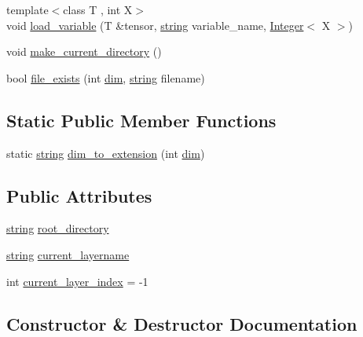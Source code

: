 \begin{DoxyCompactItemize}
\item 
{\footnotesize template$<$class T , int X$>$ }\\void \hyperlink{structbc_1_1nn_1_1Layer__Loader_a1f23f8e38f957267f2169281e79b4103}{load\+\_\+variable} (T \&tensor, \hyperlink{structbc_1_1string}{string} variable\+\_\+name, \hyperlink{structbc_1_1traits_1_1Integer}{Integer}$<$ X $>$)
\item 
void \hyperlink{structbc_1_1nn_1_1Layer__Loader_accce0f02309037abf68531b2b9f2c13d}{make\+\_\+current\+\_\+directory} ()
\item 
bool \hyperlink{structbc_1_1nn_1_1Layer__Loader_aa92b4f66ab53cad2bbb3def3303b6d30}{file\+\_\+exists} (int \hyperlink{namespacebc_a28c12b5b6f9955c77a8c4b0cf047cfb6}{dim}, \hyperlink{structbc_1_1string}{string} filename)
\end{DoxyCompactItemize}
\subsection*{Static Public Member Functions}
\begin{DoxyCompactItemize}
\item 
static \hyperlink{structbc_1_1string}{string} \hyperlink{structbc_1_1nn_1_1Layer__Loader_a94752be70d96b1f676a716b220da6075}{dim\+\_\+to\+\_\+extension} (int \hyperlink{namespacebc_a28c12b5b6f9955c77a8c4b0cf047cfb6}{dim})
\end{DoxyCompactItemize}
\subsection*{Public Attributes}
\begin{DoxyCompactItemize}
\item 
\hyperlink{structbc_1_1string}{string} \hyperlink{structbc_1_1nn_1_1Layer__Loader_a8447f957112de14989e567aab56d847b}{root\+\_\+directory}
\item 
\hyperlink{structbc_1_1string}{string} \hyperlink{structbc_1_1nn_1_1Layer__Loader_a51ea68daf7551573c3bd85d805c25da6}{current\+\_\+layername}
\item 
int \hyperlink{structbc_1_1nn_1_1Layer__Loader_a2d5ed0d0fcbe2acb9442861655f6b72d}{current\+\_\+layer\+\_\+index} = -\/1
\end{DoxyCompactItemize}


\subsection{Constructor \& Destructor Documentation}
\mbox{\label{structbc_1_1nn_1_1Layer__Loader_a6c0c0841d1783a7086914db80c806abd}} 
